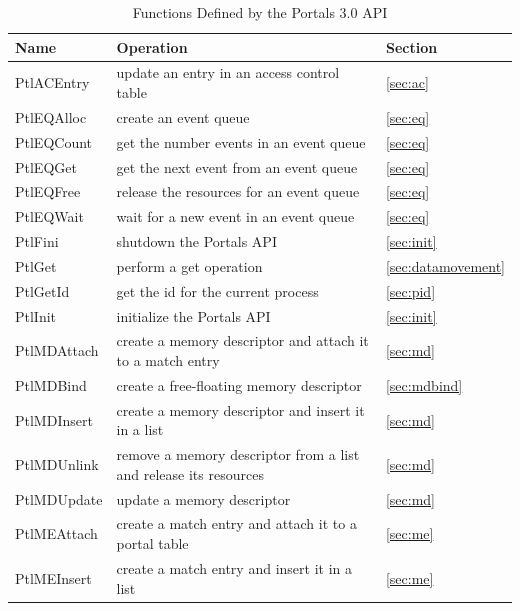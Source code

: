 \documentclass{sand-report}
\newcommand{\temp}{}
\newcommand{\PreserveBackslash}[1]{\let\temp=\\#1\let\\=\temp}
\begin{document}
\begin{table}[htbp]
  \caption{Functions Defined by the Portals 3.0 API}\label{tab:func}
  \medskip
  \begin{center}\small
    \begin{tabular}%
      {l%
        l%
       l}%
      Name & Operation & Section \\ \hline
      PtlACEntry  & update an entry in an access control table &
         \ref{sec:ac} \\
      PtlEQAlloc  & create an event queue & \ref{sec:eq} \\
      PtlEQCount   & get the number events in an event queue &
         \ref{sec:eq} \\
      PtlEQGet   & get the next event from an event queue &
         \ref{sec:eq} \\
      PtlEQFree   & release the resources for an event queue &
         \ref{sec:eq} \\
      PtlEQWait   & wait for a new event in an event queue &
         \ref{sec:eq} \\
      PtlFini     & shutdown the Portals API & \ref{sec:init} \\
      PtlGet      & perform a get operation & \ref{sec:datamovement} \\
      PtlGetId    & get the id for the current process & \ref{sec:pid} \\
      PtlInit     & initialize the Portals API & \ref{sec:init} \\
      PtlMDAttach & create a memory descriptor and attach it to a
         match entry & \ref{sec:md} \\
      PtlMDBind   & create a free-floating memory descriptor &
         \ref{sec:mdbind} \\
      PtlMDInsert & create a memory descriptor and insert it in a
         list & \ref{sec:md} \\
      PtlMDUnlink   & remove a memory descriptor from a list and
         release its resources & \ref{sec:md} \\
      PtlMDUpdate & update a memory descriptor & \ref{sec:md} \\
      PtlMEAttach & create a match entry and attach it to a portal
        table & \ref{sec:me} \\
      PtlMEInsert & create a match entry and insert it in a list &
         \ref{sec:me} \\

\end{tabular}
\end{center}
\end{table}
\end{document}
